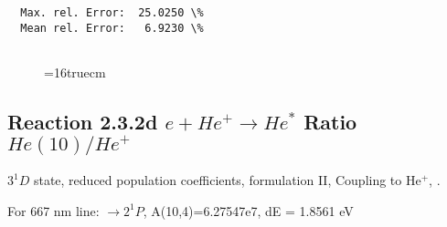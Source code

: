 \documentclass[12pt,dvipdfmx]{article}
\begin{document}
\begin{small}
\begin{verbatim}
  Max. rel. Error:  25.0250 \%
  Mean rel. Error:   6.9230 \%


\end{verbatim}\end{small}
\begin{figure} \label{2.3.2c}
\epsfxsize=16truecm
\end{figure}
\newpage


\subsection{
  Reaction 2.3.2d $e + He^+ \rightarrow He^*  $ Ratio $He(10)/He^+$
}

  $3^1D$ state,
  reduced population coefficients, formulation II,
  Coupling to He$^+$, \cite{kn:Fujimoto}.

  For 667 nm line: $\rightarrow 2^1P$, A(10,4)=6.27547e7, dE = 1.8561 eV
\end{document}
